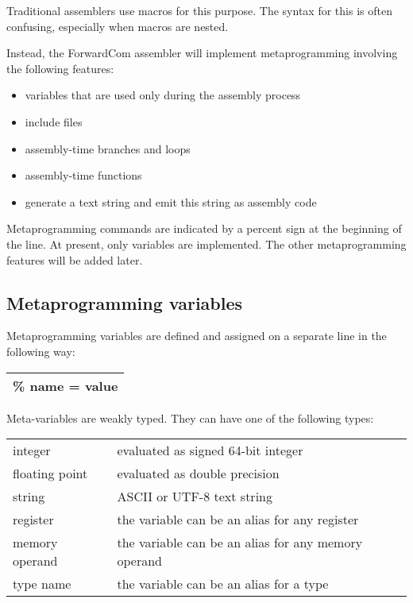 \documentclass[forwardcom.tex]{subfiles}
\begin{document}
Traditional assemblers use macros for this purpose. The syntax for this is often confusing, especially when macros are nested.
\vv

Instead, the ForwardCom assembler will implement metaprogramming involving the following features:

\begin{itemize}
\item variables that are used only during the assembly process
\item include files
\item assembly-time branches and loops
\item assembly-time functions
\item generate a text string and emit this string as assembly code
\end{itemize}

Metaprogramming commands are indicated by a percent sign at the beginning of the line.
At present, only variables are implemented. The other metaprogramming features will be added later.
\vv


\subsection{Metaprogramming variables} \label{MetaprogrammingVariables}

Metaprogramming variables are defined and assigned on a separate line in the following way:
\vv

\begin{tabular}{|p{154mm}|}
\hline
\hspace{4mm} \% name = value\\
\hline
\end{tabular}
\vspace{4mm}

Meta-variables are weakly typed. They can have one of the following types:

\begin{tabular}{|p{30mm}p{120mm}|}
\hline
integer & evaluated as signed 64-bit integer \\
floating point & evaluated as double precision\\
string & ASCII or UTF-8 text string\\
register & the variable can be an alias for any register\\
memory operand & the variable can be an alias for any memory operand\\
type name & the variable can be an alias for a type\\
\hline
\end{tabular}
\vv
\end{document}

